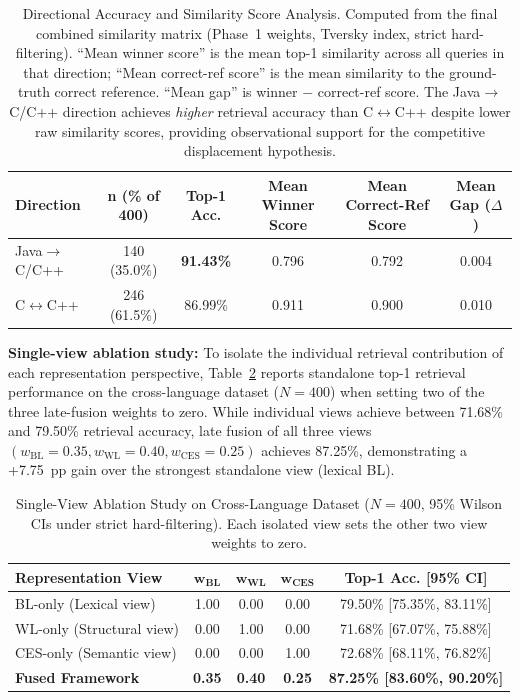 \begin{table}[!t]
\caption{Directional Accuracy and Similarity Score Analysis. Computed from the final combined similarity matrix (Phase~1 weights, Tversky index, strict hard-filtering). ``Mean winner score'' is the mean top-1 similarity across all queries in that direction; ``Mean correct-ref score'' is the mean similarity to the ground-truth correct reference. ``Mean gap'' is winner $-$ correct-ref score. The Java$\rightarrow$C/C++ direction achieves \textit{higher} retrieval accuracy than C$\leftrightarrow$C++ despite lower raw similarity scores, providing observational support for the competitive displacement hypothesis.}
\label{tab:displacement}
\centering
\begin{tabular}{|l|c|c|c|c|c|}
\hline
\textbf{Direction} & \textbf{n (\% of 400)} & \textbf{Top-1 Acc.} & \textbf{Mean Winner Score} & \textbf{Mean Correct-Ref Score} & \textbf{Mean Gap ($\Delta$)} \\
\hline
Java$\rightarrow$C/C++ & 140 (35.0\%) & \textbf{91.43\%} & 0.796 & 0.792 & 0.004 \\
C$\leftrightarrow$C++  & 246 (61.5\%) & 86.99\%          & 0.911 & 0.900 & 0.010 \\
\hline
\end{tabular}
\end{table}

\textbf{Single-view ablation study:} To isolate the individual retrieval contribution of each representation perspective, Table~\ref{tab:single_view_ablation} reports standalone top-1 retrieval performance on the cross-language dataset ($N=400$) when setting two of the three late-fusion weights to zero. While individual views achieve between 71.68\% and 79.50\% retrieval accuracy, late fusion of all three views $(w_{\text{BL}}=0.35, w_{\text{WL}}=0.40, w_{\text{CES}}=0.25)$ achieves 87.25\%, demonstrating a +7.75~pp gain over the strongest standalone view (lexical BL).

\begin{table}[ht]
\caption{Single-View Ablation Study on Cross-Language Dataset ($N=400$, 95\% Wilson CIs under strict hard-filtering). Each isolated view sets the other two view weights to zero.}
\label{tab:single_view_ablation}
\centering
\begin{tabular}{|l|c|c|c|c|}
\hline
\textbf{Representation View} & $\boldsymbol{w_{\text{BL}}}$ & $\boldsymbol{w_{\text{WL}}}$ & $\boldsymbol{w_{\text{CES}}}$ & \textbf{Top-1 Acc. [95\% CI]} \\
\hline
BL-only (Lexical view)   & 1.00 & 0.00 & 0.00 & 79.50\% [75.35\%, 83.11\%] \\
WL-only (Structural view)& 0.00 & 1.00 & 0.00 & 71.68\% [67.07\%, 75.88\%] \\
CES-only (Semantic view) & 0.00 & 0.00 & 1.00 & 72.68\% [68.11\%, 76.82\%] \\
\hline
\textbf{Fused Framework} & \textbf{0.35} & \textbf{0.40} & \textbf{0.25} & \textbf{87.25\% [83.60\%, 90.20\%]} \\
\hline
\end{tabular}
\end{table}

